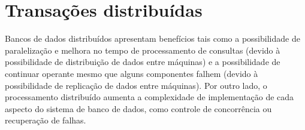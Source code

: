 \documentclass[11pt,twoside,a4paper]{book}
\begin{document}



\section{Transações distribuídas}
\label{sec:transacoes_distribuidas}
Bancos de dados distribuídos apresentam benefícios tais como a possibilidade de paralelização e melhora no tempo de processamento de consultas (devido à possibilidade de distribuição de dados entre máquinas) e a possibilidade de continuar operante mesmo que alguns componentes falhem (devido à possibilidade de replicação de dados entre máquinas). Por outro lado, o processamento distribuído aumenta a complexidade de implementação de cada aspecto do sistema de banco de dados, como controle de concorrência ou recuperação de falhas.
\end{document}
